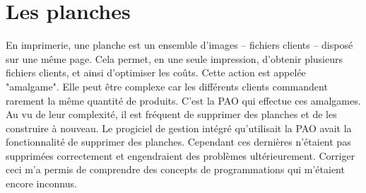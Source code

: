 \section{Les planches}
En imprimerie, une planche est un ensemble d'images -- fichiers clients -- disposé sur une même page. Cela permet, en une seule impression, d'obtenir plusieurs fichiers clients, et ainsi d'optimiser les coûts. Cette action est appelée "amalgame". Elle peut être complexe car les différents clients commandent rarement la même quantité de produits. C'est la PAO qui effectue ces amalgames. Au vu de leur complexité, il est fréquent de supprimer des planches et de les construire à nouveau.\newline
Le progiciel de gestion intégré qu'utilisait la PAO avait la fonctionnalité de supprimer des planches. Cependant ces dernières n'étaient pas supprimées correctement et engendraient des problèmes ultérieurement. Corriger ceci m'a permis de comprendre des concepts de programmations qui m'étaient encore inconnus.